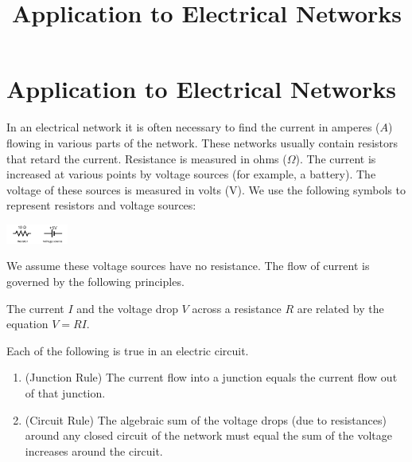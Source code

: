 \documentclass{ximera}
\title{Application to Electrical Networks} \license{CC BY-NC-SA 4.0}
\begin{document}
\begin{abstract}
 \end{abstract}
\maketitle

\section*{Application to Electrical Networks}
In an electrical network it is often necessary to find the current in amperes ($A$) flowing in various parts of the network. These networks usually contain resistors that retard the current. Resistance is measured in ohms ($\Omega$). The current is increased at various points by voltage sources (for example, a battery). The voltage of these sources is measured in volts (V). We use the following symbols to represent resistors and voltage sources:
\begin{image}
   \includegraphics[height=0.25in]{circuit7.jpg}~
 \end{image}

We assume these voltage sources have no resistance. The flow of current is governed by the following principles.

\begin{theorem}\label{001806}

The current $I$ and the voltage drop $V$ across a resistance $R$ are related by the equation $V = RI$.

\end{theorem}

\begin{theorem}\label{001809}
    Each of the following is true in an electric circuit.
\begin{enumerate}
    \item\label{item:001809j}(Junction Rule) The current flow into a junction equals the current flow out of that junction.
    \item\label{item:001809c}(Circuit Rule) The algebraic sum of the voltage drops (due to resistances) around any closed circuit of the network must equal the sum of the voltage increases around the circuit.
\end{enumerate}

\end{theorem}
\end{document}
